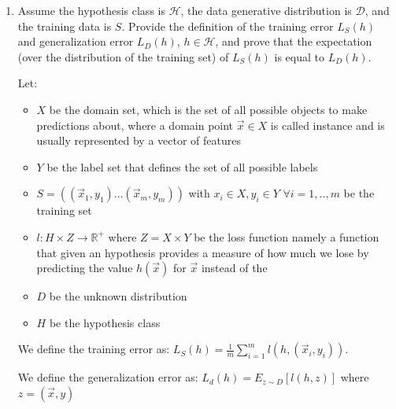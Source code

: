 \documentclass[a4paper,11pt,oneside]{book}
\begin{document}
\begin{enumerate}
\item Assume the hypothesis class is $\mathcal{H}$, the data generative distribution is $\mathcal{D}$, and the training data is $S$. Provide the definition of the training error $L_S(h)$ and generalization error $L_D(h)$, $h \in \mathcal{H}$, and prove that the expectation (over the distribution of the training set) of $L_S(h)$ is equal to $L_D(h)$.
    \begin{solution}
        Let:
        \begin{itemize}
        \item $X$ be the domain set, which is the set of all possible objects to make predictions about, where a domain point $\vec{x} \in X$ is called instance and is usually represented by a vector of features
        \item $Y$ be the label set that defines the set of all possible labels
        \item $S = ((\vec{x}_1, y_1) ... (\vec{x}_m, y_m))$ with $x_i \in X, y_i \in Y$ $\forall i = 1,..,m$ be the training set
        \item $l: H\times Z \to \mathbb{R}^+$ where $Z = X\times Y$ be the loss function namely a function that given an hypothesis provides a measure of how much we lose by predicting the value $h(\vec{x})$ for $\vec{x}$ instead of the
        \item $D$ be the unknown distribution
        \item $H$ be the hypothesis class
        \end{itemize}
        
        We define the training error as: $L_S(h) = \frac{1}{m}\sum_{i=1}^m l(h, (\vec{x}_i,y_i))$.
        
        We define the generalization error as: $L_d(h) = E_{z\sim D}[l(h,z)]$ where $z = (\vec{x}, y)$
        

\end{solution}
\end{enumerate}
\end{document}
